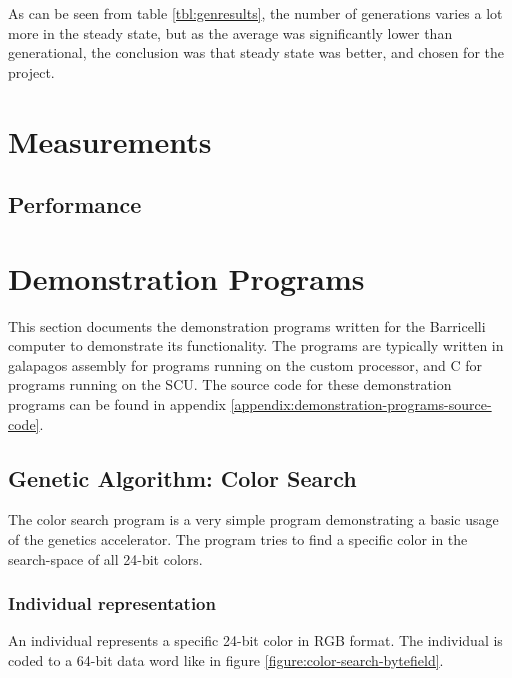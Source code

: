 As can be seen from table \ref{tbl:genresults}, the number of generations varies a lot more in the steady state, but as the average was significantly lower than generational, the conclusion was that steady state was better, and chosen for the project.


\section{Measurements}

\subsection{Performance}







\section{Demonstration Programs}

This section documents the demonstration programs written for the Barricelli computer to demonstrate its functionality.
The programs are typically written in \gls{galapagos} assembly for programs running on the custom processor, and C for programs running on the \Gls{SCU}.
The source code for these demonstration programs can be found in appendix \vref{appendix:demonstration-programs-source-code}.

\subsection{Genetic Algorithm: Color Search}

The color search program is a very simple program demonstrating a basic usage of the genetics accelerator.
The program tries to find a specific color in the search-space of all 24-bit colors.

\subsubsection{Individual representation}

An individual represents a specific 24-bit color in RGB format.
The individual is coded to a 64-bit data word like in figure \vref{figure:color-search-bytefield}.

